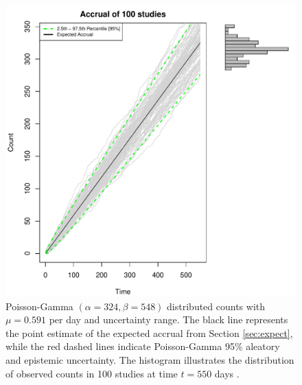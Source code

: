 \begin{figure}
\begin{knitrout}
\color{fgcolor}

{\centering \includegraphics[width=\textwidth-3cm]{figure/ch02_figunnamed-chunk-8-1} 

}


\end{knitrout}
  \caption{Poisson-Gamma $(\alpha = 324, \beta = 548)$ distributed counts with $\mu = 0.591$ per day and uncertainty range. The black line represents the point estimate of the expected accrual from Section \ref{sec:expect}, while the red dashed lines indicate Poisson-Gamma 95\% aleatory and epistemic uncertainty. The histogram illustrates the distribution of observed counts in 100 studies at time $t = 550$ days \citep{spiegelhalter2011visualizing, pkgacc}.}
  \label{fig:2_7}
\end{figure}




